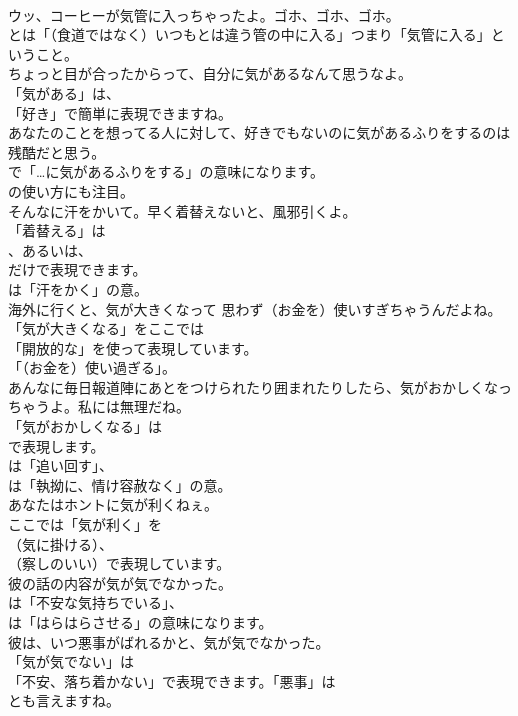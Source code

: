 \documentclass[8pt]{extreport}
\begin{document}
\begin{CJK}{UTF8}{min}
\\	ウッ、コーヒーが気管に入っちゃったよ。ゴホ、ゴホ、ゴホ。 
\\	とは「（食道ではなく）いつもとは違う管の中に入る」つまり「気管に入る」ということ。	
\\	ちょっと目が合ったからって、自分に気があるなんて思うなよ。 
\\	「気がある」は、
\\	「好き」で簡単に表現できますね。	
\\	あなたのことを想ってる人に対して、好きでもないのに気があるふりをするのは残酷だと思う。 
\\	で「…に気があるふりをする」の意味になります。
\\	の使い方にも注目。	
\\	そんなに汗をかいて。早く着替えないと、風邪引くよ。 
\\	「着替える」は 
\\	、あるいは、
\\	だけで表現できます。
\\	は「汗をかく」の意。	
\\	海外に行くと、気が大きくなって 思わず（お金を）使いすぎちゃうんだよね。 
\\	「気が大きくなる」をここでは
\\	「開放的な」を使って表現しています。
\\	「（お金を）使い過ぎる」。	
\\	あんなに毎日報道陣にあとをつけられたり囲まれたりしたら、気がおかしくなっちゃうよ。私には無理だね。 
\\	「気がおかしくなる」は 
\\	で表現します。
\\	は「追い回す」、
\\	は「執拗に、情け容赦なく」の意。	
\\	あなたはホントに気が利くねぇ。 
\\	ここでは「気が利く」を 
\\	（気に掛ける）、
\\	（察しのいい）で表現しています。	
\\	彼の話の内容が気が気でなかった。 
\\	は「不安な気持ちでいる」、
\\	は「はらはらさせる」の意味になります。	
\\	彼は、いつ悪事がばれるかと、気が気でなかった。 
\\	「気が気でない」は
\\	「不安、落ち着かない」で表現できます。「悪事」は
\\	とも言えますね。

\end{CJK}
\end{document}
